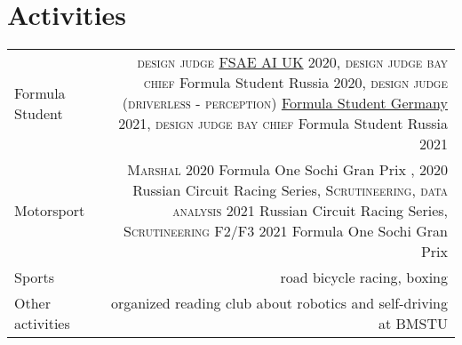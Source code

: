 \section*{Activities}
\begin{tabular}{@{}L!{\VRule}R}
    Formula Student  & {\textsc{design judge}} \href{https://www.imeche.org/events/formula-student/team-information/fs-ai}{FSAE AI UK} 2020,
    {\textsc{design judge bay chief}} Formula Student Russia 2020,
    {\textsc{design judge (driverless - perception)}} \href{https://www.formulastudent.de/fsg/}{Formula Student Germany} 2021,
    {\textsc{design judge bay chief}} Formula Student Russia 2021                                                                            \\
    Motorsport       & {\textsc{Marshal}} 2020 Formula One Sochi Gran Prix , 2020 Russian Circuit Racing Series,
    {\textsc{Scrutineering, data analysis}} 2021 Russian Circuit Racing Series,
    {\textsc{Scrutineering F2/F3}} 2021 Formula One Sochi Gran Prix                                                                          \\
    Sports           & road bicycle racing, boxing                                                                                           \\
    Other activities & organized reading club about robotics and self-driving at BMSTU
\end{tabular}